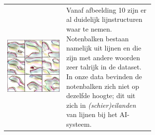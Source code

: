 \documentclass[dutch, twoside, a4paper, 10pt]{article}
\begin{document}
\begin{table}[H]
\begin{tabular}{c p{0.6\linewidth}}
          \includegraphics[scale=0.18]{10-interp.jpg}   & \vspace{-10\baselineskip}Vanaf afbeelding 10 zijn er al duidelijk lijnstructuren waar te nemen. Notenbalken bestaan namelijk uit lijnen en die zijn met andere woorden zeer talrijk in de dataset. In onze data bevinden de notenbalken zich niet op dezelfde hoogte; dit uit zich in \textit{(schier)eilanden} van lijnen bij het AI-systeem. \\

\end{tabular}
\end{table}
\end{document}
